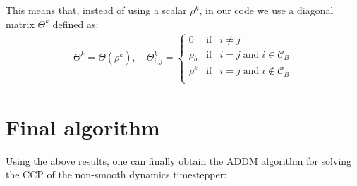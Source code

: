 \documentclass[AMA,STIX1COL]{WileyNJD-v2}
\begin{document}
This means that, instead of using a scalar $\rho^{k}$, in our code we use a diagonal matrix $\Theta^{k}$ defined as:
\begin{align}
\Theta^k = \Theta(\rho^k), \quad 
 \Theta_{i,j}^{k} = 
		\left\{
			\begin{matrix}
			0 & \mathrm{if} & i \neq j\\
			\rho_b & \mathrm{if} & i = j  \;  \mathrm{and} \; i \in \mathcal{C}_B \\
			\rho^{k} & \mathrm{if} & i = j  \;  \mathrm{and} \; i \notin \mathcal{C}_B \\
			\end{matrix}
		\right. 
\end{align}



		




\section{Final algorithm}

Using the above results, one can finally obtain the ADDM algorithm for solving the CCP of the non-smooth dynamics timestepper:
\end{document}
